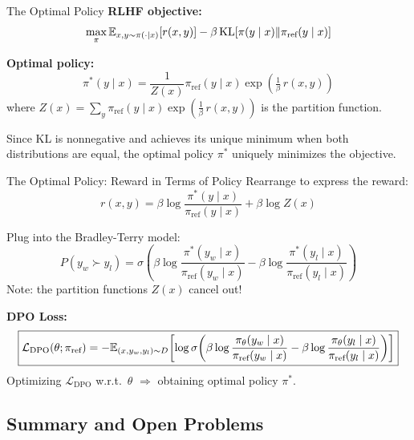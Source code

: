 \begin{frame}{The Optimal Policy}
  \textbf{RLHF objective:}
  \[
    \max_{\pi} \mathbb{E}_{x, y \sim \pi(\cdot|x)}[r(x, y)] - \beta\,\text{KL}[\pi(y \mid x) \| \pi_\text{ref}(y \mid x)]
  \]

  \textbf{Optimal policy:}
  \[
    \pi^*(y \mid x) = \frac{1}{Z(x)} \pi_\text{ref}(y \mid x) \exp\!\left(\tfrac{1}{\beta}\,r(x, y)\right)
  \]
  where $Z(x) = \sum_y \pi_\text{ref}(y \mid x) \exp\!\left(\frac{1}{\beta}\,r(x, y)\right)$ is the partition function.

  \vspace{0.5em}
  Since KL is nonnegative and achieves its unique minimum when both distributions are equal, the optimal policy $\pi^*$ uniquely minimizes the objective.
\end{frame}

\begin{frame}{The Optimal Policy: Reward in Terms of Policy}
  Rearrange to express the reward:
  \[
    r(x, y) = \beta \log \frac{\pi^*(y \mid x)}{\pi_\text{ref}(y \mid x)} + \beta \log Z(x)
  \]

  Plug into the Bradley-Terry model:
  \[
    P(y_w \succ y_l) = \sigma\!\left(\beta \log \frac{\pi^*(y_w \mid x)}{\pi_\text{ref}(y_w \mid x)} - \beta \log \frac{\pi^*(y_l \mid x)}{\pi_\text{ref}(y_l \mid x)}\right)
  \]
  Note: the partition functions $Z(x)$ cancel out!

  \vspace{0.5em}
  \textbf{DPO Loss:}
  \[
    \boxed{\mathcal{L}_\text{DPO}(\theta; \pi_\text{ref}) = -\mathbb{E}_{(x,y_w,y_l) \sim D}\!\left[\log \sigma\!\left(\beta \log \frac{\pi_\theta(y_w \mid x)}{\pi_\text{ref}(y_w \mid x)} - \beta \log \frac{\pi_\theta(y_l \mid x)}{\pi_\text{ref}(y_l \mid x)}\right)\right]}
  \]
  Optimizing $\mathcal{L}_\text{DPO}$ w.r.t.\ $\theta$ $\Rightarrow$ obtaining optimal policy $\pi^*$.
\end{frame}

\subsection{Summary and Open Problems}

